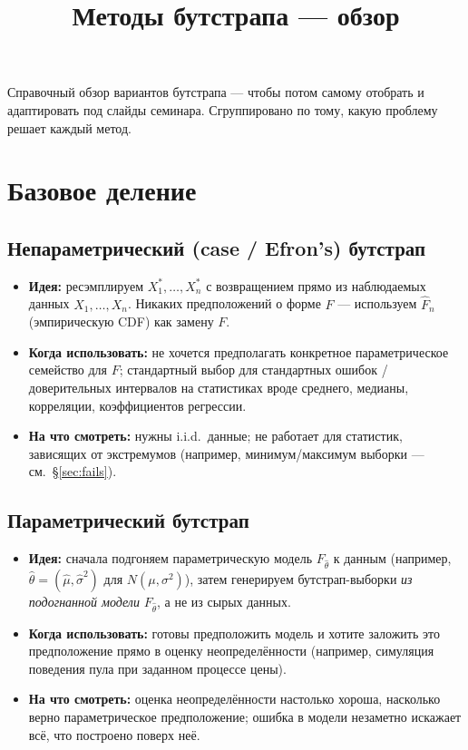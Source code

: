 \documentclass[11pt]{article}
\title{\vspace{-1.5em}Методы бутстрапа --- обзор}
\author{}
\date{}
\begin{document}
\maketitle
\vspace{-2.5em}

Справочный обзор вариантов бутстрапа --- чтобы потом самому отобрать и адаптировать под слайды семинара. Сгруппировано по тому, какую проблему решает каждый метод.

\section{Базовое деление}

\subsection*{Непараметрический (case / Efron's) бутстрап}
\begin{itemize}
  \item \textbf{Идея:} ресэмплируем $X_1^*,\dots,X_n^*$ с возвращением прямо из наблюдаемых данных $X_1,\dots,X_n$. Никаких предположений о форме $F$ --- используем $\widehat F_n$ (эмпирическую CDF) как замену $F$.
  \item \textbf{Когда использовать:} не хочется предполагать конкретное параметрическое семейство для $F$; стандартный выбор для стандартных ошибок / доверительных интервалов на статистиках вроде среднего, медианы, корреляции, коэффициентов регрессии.
  \item \textbf{На что смотреть:} нужны i.i.d.\ данные; не работает для статистик, зависящих от экстремумов (например, минимум/максимум выборки --- см.\ \S\ref{sec:fails}).
\end{itemize}

\subsection*{Параметрический бутстрап}
\begin{itemize}
  \item \textbf{Идея:} сначала подгоняем параметрическую модель $F_{\hat\theta}$ к данным (например, $\hat\theta = (\hat\mu,\hat\sigma^2)$ для $N(\mu,\sigma^2)$), затем генерируем бутстрап-выборки \emph{из подогнанной модели} $F_{\hat\theta}$, а не из сырых данных.
  \item \textbf{Когда использовать:} готовы предположить модель и хотите заложить это предположение прямо в оценку неопределённости (например, симуляция поведения пула при заданном процессе цены).
  \item \textbf{На что смотреть:} оценка неопределённости настолько хороша, насколько верно параметрическое предположение; ошибка в модели незаметно искажает всё, что построено поверх неё.
\end{itemize}
\end{document}
